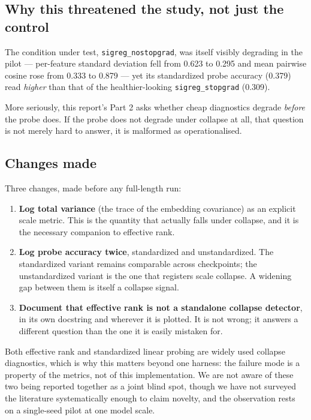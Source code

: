 \subsection{Why this threatened the study, not just the control}

The condition under test, \texttt{sigreg\_nostopgrad}, was itself visibly degrading in the
pilot --- per-feature standard deviation fell from 0.623 to 0.295 and mean pairwise cosine
rose from 0.333 to 0.879 --- yet its standardized probe accuracy (0.379) read
\emph{higher} than that of the healthier-looking \texttt{sigreg\_stopgrad} (0.309).

More seriously, this report's Part 2 asks whether cheap diagnostics degrade \emph{before}
the probe does. If the probe does not degrade under collapse at all, that question is not
merely hard to answer, it is malformed as operationalised. \ours{}

\subsection{Changes made}

Three changes, made before any full-length run:

\begin{enumerate}
  \item \textbf{Log total variance} (the trace of the embedding covariance) as an explicit
        scale metric. This is the quantity that actually falls under collapse, and it is
        the necessary companion to effective rank.
  \item \textbf{Log probe accuracy twice}, standardized and unstandardized. The
        standardized variant remains comparable across checkpoints; the unstandardized
        variant is the one that registers scale collapse. A widening gap between them is
        itself a collapse signal.
  \item \textbf{Document that effective rank is not a standalone collapse detector},
        in its own docstring and wherever it is plotted. It is not wrong; it answers a
        different question than the one it is easily mistaken for.
\end{enumerate}

\established{} Both effective rank and standardized linear probing are widely used
collapse diagnostics, which is why this matters beyond one harness: the failure mode is a
property of the metrics, not of this implementation. \ours{} We are not aware of these two
being reported together as a joint blind spot, though we have not surveyed the literature
systematically enough to claim novelty, and the observation rests on a single-seed pilot
at one model scale.

